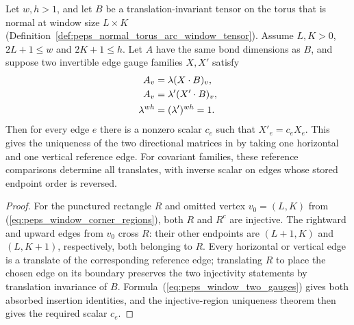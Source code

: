 \begin{lemma}%
    \label{thm:peps_window_gauge_unique}
    \leanok
    Let $w,h>1$, and let $B$ be a translation-invariant tensor on the torus
    that is normal at window size $L\times K$
    (Definition~\ref{def:peps_normal_torus_arc_window_tensor}).
    Assume $L,K>0$, $2L+1\leq w$ and $2K+1\leq h$.
    Let $A$ have the same bond dimensions as $B$, and suppose two invertible
    edge gauge families $X,X'$ satisfy
    \begin{align}
        A_v          & =\lambda(X\cdot B)_v,\notag   \\
        A_v          & =\lambda'(X'\cdot B)_v,\notag \\
        \lambda^{wh} & =(\lambda')^{wh}=1.
        \label{eq:peps_window_two_gauges}
    \end{align}
    Then for every edge $e$ there is a nonzero scalar $c_e$ such that
    $X'_e=c_eX_e$.
    This gives the uniqueness of the two directional matrices in
    \cite[normal TI PEPS corollary]{Molnar2018NormalPEPS} by taking one
    horizontal and one vertical reference edge. For covariant families,
    these reference comparisons determine all translates, with inverse
    scalar on edges whose stored endpoint order is reversed.
\end{lemma}
\begin{proof}\leanok
    For the punctured rectangle $R$ and omitted vertex $v_0=(L,K)$ from
    (\ref{eq:peps_window_corner_regions}), both $R$ and $R^c$ are injective.
    The rightward and upward edges from $v_0$ cross $R$: their other endpoints
    are $(L+1,K)$ and $(L,K+1)$, respectively, both belonging to $R$.
    Every horizontal or vertical edge is a translate of the corresponding
    reference edge; translating $R$ to place the chosen edge on its boundary
    preserves the two injectivity statements by translation invariance of $B$.
    Formula~(\ref{eq:peps_window_two_gauges}) gives both absorbed insertion
    identities, and the injective-region uniqueness theorem then gives the
    required scalar $c_e$.
\end{proof}
